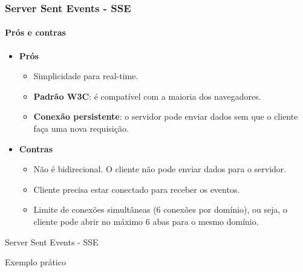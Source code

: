\documentclass[
	9pt, %
	t, %
]{beamer}
\begin{document}
\begin{frame}
	\frametitle{Server Sent Events - SSE}
	\framesubtitle{Prós e contras}

	\begin{itemize}
		\item \textbf{Prós}
		      \begin{itemize}
			      \item Simplicidade para real-time.
			      \item \textbf{Padrão W3C}: é compatível com a maioria dos navegadores.
			      \item \textbf{Conexão persistente}: o servidor pode enviar dados sem que o cliente faça uma nova requisição.
		      \end{itemize}
		\item \textbf{Contras}
		      \begin{itemize}
			      \item \alert{Não é bidirecional}. O cliente não pode enviar dados para o servidor.
			      \item Cliente precisa estar \alert{conectado} para receber os eventos.
			      \item \alert{Limite de conexões simultâneas} (6 conexões por domínio), ou seja, o cliente pode abrir no máximo 6 abas para o mesmo domínio.
		      \end{itemize}

	\end{itemize}

\end{frame}

\begin{frame}
	\begin{center}

		\bigskip\bigskip\bigskip\bigskip %
		{\Large Server Sent Events - SSE}

		\bigskip\bigskip %
		{\Huge Exemplo prático}

	\end{center}

\end{frame}
\end{document}
